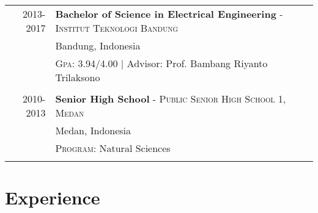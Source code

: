 \documentclass[a4paper,10pt]{article} %
\begin{document}
\begin{tabular}{rl}	
2013-2017 & \textbf{Bachelor of Science in Electrical Engineering} - \textsc{Institut Teknologi Bandung}\\ 
&Bandung, Indonesia\\
&\normalsize \textsc{Gpa}: 3.94/4.00 | \small Advisor: Prof. Bambang Riyanto Trilaksono\\
&\\


2010-2013 & \textbf{Senior High School} - \normalsize\textsc{Public Senior High School 1, Medan}\\
& Medan, Indonesia\\
&\normalsize \textsc{Program}: Natural Sciences\\
&\\

\end{tabular}

\vspace{-4mm}
\section{Experience}
\end{document}
